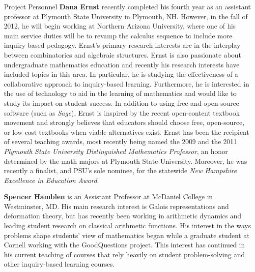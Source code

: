 \documentclass[11pt]{article}
\begin{document}
\begin{section}{Project Personnel}
\textbf{Dana Ernst} recently completed his fourth year as an assistant
professor at Plymouth State University in Plymouth, NH.  However, in the
fall of 2012, he will begin working at Northern Arizona University, where
one of his main service duties will be to revamp the calculus sequence to
include more inquiry-based pedagogy.  Ernst's primary research interests
are in the interplay between combinatorics and algebraic structures.
Ernst is also passionate about undergraduate mathematics education and
recently his research interests have included topics in this area. In
particular, he is studying the effectiveness of a collaborative approach
to inquiry-based learning.  Furthermore, he is interested in the use of
technology to aid in the learning of mathematics and would like to study
its impact on student success.  In addition to using free and open-source
software (such as \emph{Sage}), Ernst is inspired by the recent
open-content textbook movement and strongly believes that educators should
choose free, open-source, or low cost textbooks when viable alternatives
exist.  Ernst has been the recipient of several teaching awards, most
recently being named the 2009 and the 2011 \emph{Plymouth State University
Distinguished Mathematics Professor}, an honor determined by the math
majors at Plymouth State University.  Moreover, he was recently a
finalist, and PSU's sole nominee, for the statewide \emph{New Hampshire
Excellence in Education Award}.

\textbf{Spencer Hamblen} is an Assistant Professor at McDaniel College in
Westminster, MD.  His main research interest is Galois representations and
deformation theory, but has recently been working in arithmetic dynamics
and leading student research on classical arithmetic functions.  His
interest in the ways problems shape students' view of mathematics began
while a graduate student at Cornell working with the GoodQuestions
project.  This interest has continued in his current teaching of courses
that rely heavily on student problem-solving and other inquiry-based
learning courses.


\end{section}
\end{document}

